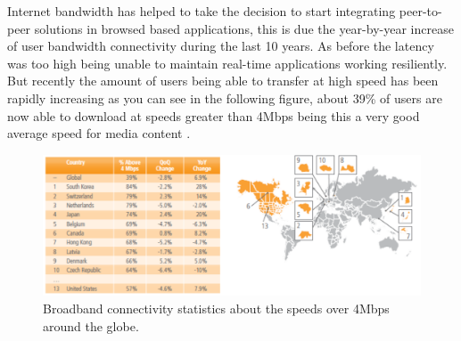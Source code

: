 Internet bandwidth has helped to take the decision to start integrating peer-to-peer solutions in browsed based applications, this is due the year-by-year increase of user bandwidth connectivity during the last 10 years. As before the latency was too high being unable to maintain real-time applications working resiliently. But recently the amount of users being able to transfer at high speed has been rapidly increasing as you can see in the following figure, about 39\% of users are now able to download at speeds greater than 4Mbps being this a very good average speed for media content \cite{akamaiq2}.

\begin{figure}[h]
  \centering
    \includegraphics[width=1\textwidth]{./figures/internetstats.pdf}
      \caption[Broadband over 4Mbps connectivity statistics]{Broadband connectivity statistics about the speeds over 4Mbps around the globe.}
\end{figure}


